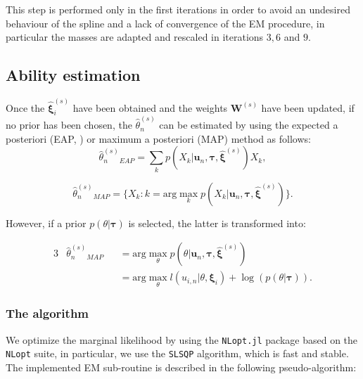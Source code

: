 This step is performed only in the first iterations in order to avoid an undesired behaviour of the spline and a lack of convergence of the EM procedure, in particular the masses are adapted and rescaled in iterations $3,6$ and $9$.

\subsection{Ability estimation}


Once the $\hat{\boldsymbol{\xi}}_i^{(s)}$ have been obtained and the weights $\boldsymbol{W}^{(s)}$ have been updated, if no prior has been chosen, the $\hat{\theta}_n^{(s)}$ can be estimated by using the expected a posteriori (EAP, \textcite{BockMislevy1982}) or maximum a posteriori (MAP) method as follows:
\[\hat{\theta}_n^{(s)}{}_{EAP}=\sum_k{p(X_k|\boldsymbol{u}_n,\boldsymbol{\tau},\hat{\boldsymbol{\xi}}^{(s)})X_k},\]

\[\hat{\theta}_n^{(s)}{}_{MAP}=\{X_k : k=\text{arg}\max_k p(X_k|\boldsymbol{u}_n,\boldsymbol{\tau},\hat{\boldsymbol{\xi}}^{(s)}) \}.\]

However, if a prior $p(\theta|\boldsymbol{\tau})$ is selected, the latter is transformed into:

\begin{alignat*}{3}
& \hat{\theta}_n^{(s)}{}_{MAP}&&=\text{arg}\max_\theta p(        \theta|\boldsymbol{u}_n,\boldsymbol{\tau},\hat{\boldsymbol{\xi}}^{(s)}) \\
& &&=\text{arg}\max_\theta \mathit{l}(u_{i,n}|\theta,\boldsymbol{\xi}_i)+\log(p(\theta|\boldsymbol{\tau})).
\end{alignat*}
\color{black}

\subsubsection{The algorithm}

We optimize the marginal likelihood by using the \texttt{NLopt.jl} package based on the \texttt{NLopt} suite, in particular, we use the \texttt{SLSQP} algorithm, which is fast and stable. The implemented EM sub-routine is described in the following pseudo-algorithm:

